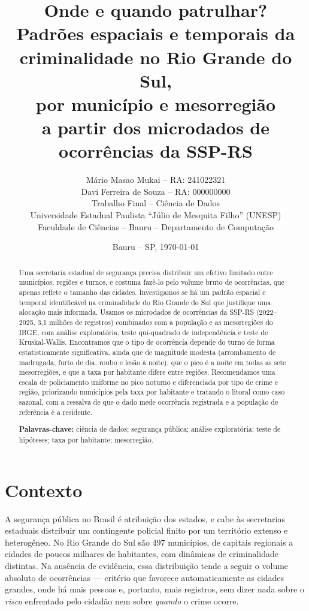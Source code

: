 \documentclass[a4paper,11pt]{article}
\title{\textbf{Onde e quando patrulhar?}\\[2mm]
\large Padrões espaciais e temporais da criminalidade no Rio Grande do Sul,\\
por município e mesorregião\\
\normalsize a partir dos microdados de ocorrências da SSP-RS}
\author{
Mário Masao Mukai -- RA: 241022321\\
Davi Ferreira de Souza -- RA: 000000000\\[2mm]
\small Trabalho Final -- Ciência de Dados\\
\small Universidade Estadual Paulista ``Júlio de Mesquita Filho'' (UNESP)\\
\small Faculdade de Ciências -- Bauru -- Departamento de Computação
}
\date{Bauru -- SP, \today}
\begin{document}
\maketitle

\begin{abstract}
\noindent
Uma secretaria estadual de segurança precisa distribuir um efetivo limitado
entre municípios, regiões e turnos, e costuma fazê-lo pelo volume bruto de
ocorrências, que apenas reflete o tamanho das cidades. Investigamos se há um
padrão espacial e temporal identificável na criminalidade do Rio Grande do Sul
que justifique uma alocação mais informada. Usamos os microdados de ocorrências
da SSP-RS (2022--2025, 3,1 milhões de registros) combinados com a população e as
mesorregiões do IBGE, com análise exploratória, teste qui-quadrado de
independência e teste de Kruskal-Wallis. Encontramos que o tipo de ocorrência
depende do turno de forma estatisticamente significativa, ainda que de magnitude
modesta (arrombamento de madrugada, furto de dia, roubo e lesão à noite), que o
pico é a noite em todas as sete mesorregiões, e que a taxa por habitante difere
entre regiões. Recomendamos uma escala de policiamento uniforme no pico noturno e
diferenciada por tipo de crime e região, priorizando municípios pela taxa por
habitante e tratando o litoral como caso sazonal, com a ressalva de que o dado
mede ocorrência registrada e a população de referência é a residente.

\vspace{2mm}
\noindent\textbf{Palavras-chave:} ciência de dados; segurança pública;
análise exploratória; teste de hipóteses; taxa por habitante; mesorregião.
\end{abstract}

\section{Contexto}\label{sec:contexto}
A segurança pública no Brasil é atribuição dos estados, e cabe às secretarias
estaduais distribuir um contingente policial finito por um território extenso e
heterogêneo. No Rio Grande do Sul são 497 municípios, de capitais regionais a
cidades de poucos milhares de habitantes, com dinâmicas de criminalidade
distintas. Na ausência de evidência, essa distribuição tende a seguir o volume
absoluto de ocorrências --- critério que favorece automaticamente as cidades
grandes, onde há mais pessoas e, portanto, mais registros, sem dizer nada sobre
o \emph{risco} enfrentado pelo cidadão nem sobre \emph{quando} o crime ocorre.
\end{document}

